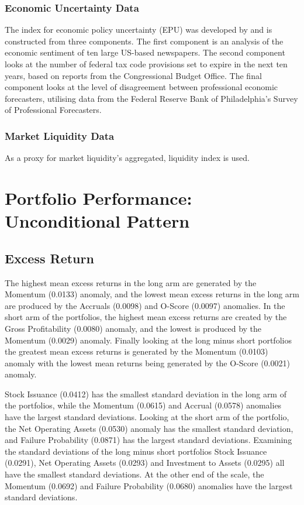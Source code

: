 \documentclass[12pt, a4paper, oneside]{article}
\begin{document}
\subsubsection{Economic Uncertainty Data}
The index for economic policy uncertainty (EPU) was developed by\cite{baker2016measuring} and is constructed from three components. The first component is an analysis of the economic sentiment of ten large US-based newspapers. The second component looks at the number of federal tax code provisions set to expire in the next ten years, based on reports from the Congressional Budget Office. The final component looks at the level of disagreement between professional economic forecasters, utilising data from the Federal Reserve Bank of Philadelphia's Survey of Professional Forecasters.

\subsubsection{Market Liquidity Data}
As a proxy for market liquidity\cite{pastor2003liquidity}'s aggregated, liquidity index is used. 


\section{Portfolio Performance: Unconditional Pattern}\label{sec:unconditional}
\subsection{Excess Return }
The highest mean excess returns in the long arm are generated by the Momentum (0.0133) anomaly, and the lowest mean excess returns in the long arm are produced by the Accruals (0.0098) and O-Score (0.0097) anomalies. In the short arm of the portfolios, the highest mean excess returns are created by the Gross Profitability (0.0080) anomaly, and the lowest is produced by the Momentum (0.0029) anomaly. Finally looking at the long minus short portfolios the greatest mean excess returns is generated by the Momentum (0.0103) anomaly with the lowest mean returns being generated by the O-Score (0.0021) anomaly.

Stock Issuance (0.0412) has the smallest standard deviation in the long arm of the portfolios, while the Momentum (0.0615) and Accrual (0.0578) anomalies have the largest standard deviations. Looking at the short arm of the portfolio, the Net Operating Assets (0.0530) anomaly has the smallest standard deviation, and Failure Probability (0.0871) has the largest standard deviations. Examining the standard deviations of the long minus short portfolios Stock Issuance (0.0291), Net Operating Assets (0.0293) and Investment to Assets (0.0295) all have the smallest standard deviations. At the other end of the scale, the Momentum (0.0692) and Failure Probability (0.0680) anomalies have the largest standard deviations.
\end{document}
